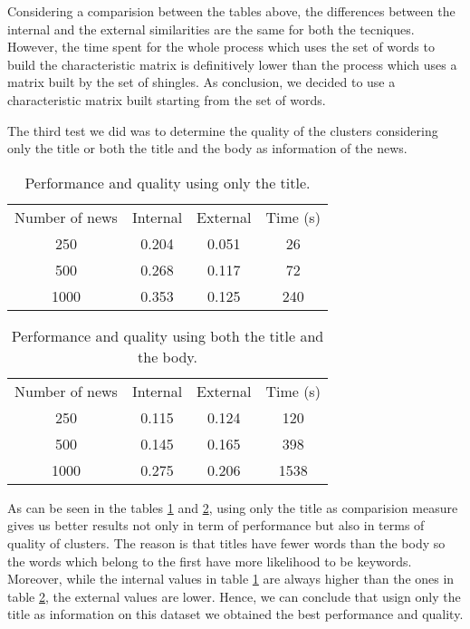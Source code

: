 \documentclass{acm_proc_article-sp}
\begin{document}
Considering a comparision between the tables above, the differences between the internal and the external similarities are the same for both the tecniques. However, the time spent for the whole process which uses the set of words to build the characteristic matrix is definitively lower than the process which uses a matrix built by the set of shingles. As conclusion, we decided to use a characteristic matrix built starting from the set of words.


The third test we did was to determine the quality of the clusters considering only the title or both the title and the body as information of the news.

\begin{table}[!ht]
\centering
\label{table:title}
\begin{tabular}{cccc}
Number of news & Internal & External & Time (s) \\
250            & 0.204    & 0.051    & 26       \\
500            & 0.268    & 0.117    & 72       \\
1000           & 0.353    & 0.125    & 240      \\
\end{tabular}
\caption{Performance and quality using only the title.}
\end{table}

\begin{table}[!ht]
\centering
\label{table:body}
\begin{tabular}{cccc}
Number of news & Internal & External & Time (s) \\
250            & 0.115    & 0.124    & 120      \\
500            & 0.145    & 0.165    & 398      \\
1000           & 0.275    & 0.206    & 1538 
\end{tabular}
\caption{Performance and quality using both the title and the body.}
\end{table}

As can be seen in the tables \ref{table:title} and \ref{table:body}, using only the title as comparision measure gives us better results not only in term of performance but also in terms of quality of clusters. The reason is that titles have fewer words than the body so the words which belong to the first have more likelihood to be keywords. Moreover, while the internal values in table \ref{table:title} are always higher than the ones in table \ref{table:body}, the external values are lower. Hence, we can conclude that usign only the title as information on this dataset we obtained the best performance and quality.
\end{document}
